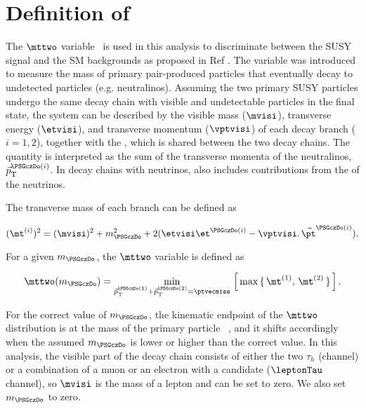 \section{\texorpdfstring{Definition of \mttwo}{Definition of MT2}}
\label{sect:mt2def}
The $\mttwo$ variable~\cite{Lester:1999tx,Barr:2003rg} is used in this analysis to discriminate between the SUSY signal and the SM backgrounds as proposed in Ref \cite{Barr:2009wu}. The variable was introduced to measure the mass of primary pair-produced  particles that eventually decay to undetected particles (e.g. neutralinos). Assuming the two primary SUSY particles undergo the same decay chain with visible and undetectable particles in the final state, the system can be described by the visible mass ($\mvisi$), transverse energy ($\etvisi$), and transverse momentum ($\vptvisi$) of each decay branch ($i=1,2$), together with the 
\ptvecmiss, which is shared between the two decay chains. The quantity \ptvecmiss is interpreted as the sum of the transverse momenta
of the neutralinos, $\vec{p}_{\rm T}^{\PSGczDo(i)}$.
In decay chains with neutrinos, \ptvecmiss also includes contributions from the \ptvec of the neutrinos.

The transverse mass of each branch can be defined as 
\begin{linenomath}
\begin{equation}
\label{eq:mtdef}
(\mt^{(i)})^{2}= (\mvisi)^2+m^2_{\PSGczDo}+2(\etvisi\et^{\PSGczDo(i)}-{\vptvisi}.\,{\vec{\pt}^{\PSGczDo(i)}}).
\end{equation}
\end{linenomath}

For a given $m_{\PSGczDo}$, the $\mttwo$ variable is defined as
\begin{linenomath}
\begin{equation}
\label{eq:mt2def}
\mttwo(m_{\PSGczDo})=\min_{\vec{p}^{\PSGczDo(1)}_{\rm T}+\vec{p}_{\rm T}^{\PSGczDo(2)}=\ptvecmiss}\,\left[\,\max\,\{ \, \mt^{(1)},\,\mt^{(2)}\,\}\,\right].
\end{equation}
\end{linenomath}

For the correct value of $m_{\PSGczDo}$, the kinematic endpoint of the $\mttwo$ distribution is at the mass of the primary particle ~\cite{Affolder:2000bpa,Abazov:2002bu}, and it shifts accordingly when the assumed $m_{\PSGczDo}$ is lower or higher than the correct value. In this analysis, 
the visible part of the decay chain consists of either the two $\tau_h$ (\tauTau channel)
or a combination of a muon or an electron with a \Tau candidate ($\leptonTau$ channel), so $\mvisi$ is the mass of a lepton and can be set to zero. We also set $m_{\PSGczDo}$ to zero. 

